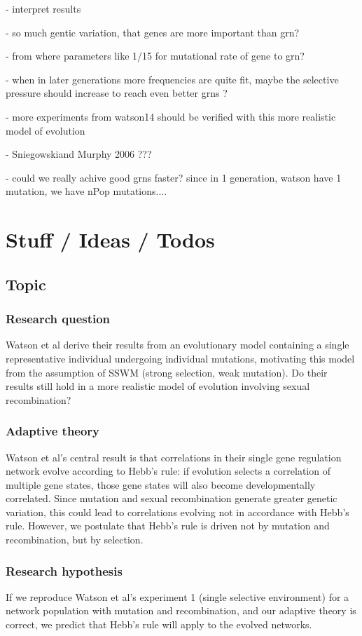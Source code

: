 \documentclass{article}
\begin{document}
- interpret results

- so much gentic variation, that genes are more important than grn?

- from where parameters like 1/15 for mutational rate of gene to grn?

- when in later generations more frequencies are quite fit, maybe the selective pressure should increase to reach even better grns ?

- more experiments from watson14 should be verified with this more realistic model of evolution

- Sniegowskiand Murphy 2006 ???

- could we really achive good grns faster? since in 1 generation, watson have 1 mutation, we have nPop mutations.... 


\section{Stuff / Ideas / Todos}

\subsection{Topic}
\subsubsection{Research question}
Watson et al derive their results from an evolutionary model containing a single representative individual undergoing individual mutations, motivating this model from the assumption of SSWM (strong selection, weak mutation). Do their results still hold in a more realistic model of evolution involving sexual recombination?

\subsubsection{Adaptive theory}
Watson et al’s central result is that correlations in their single gene regulation network evolve according to Hebb’s rule: if evolution selects a correlation of multiple gene states, those gene states will also become developmentally correlated. Since mutation and sexual recombination generate greater genetic variation, this could lead to correlations evolving not in accordance with Hebb's rule. However, we postulate that Hebb’s rule is driven not by mutation and recombination, but by selection.

\subsubsection{Research hypothesis}
If we reproduce Watson et al’s experiment 1 (single selective environment) for a network population with mutation and recombination, and our adaptive theory is correct, we predict that Hebb’s rule will apply to the evolved networks.
\end{document}
